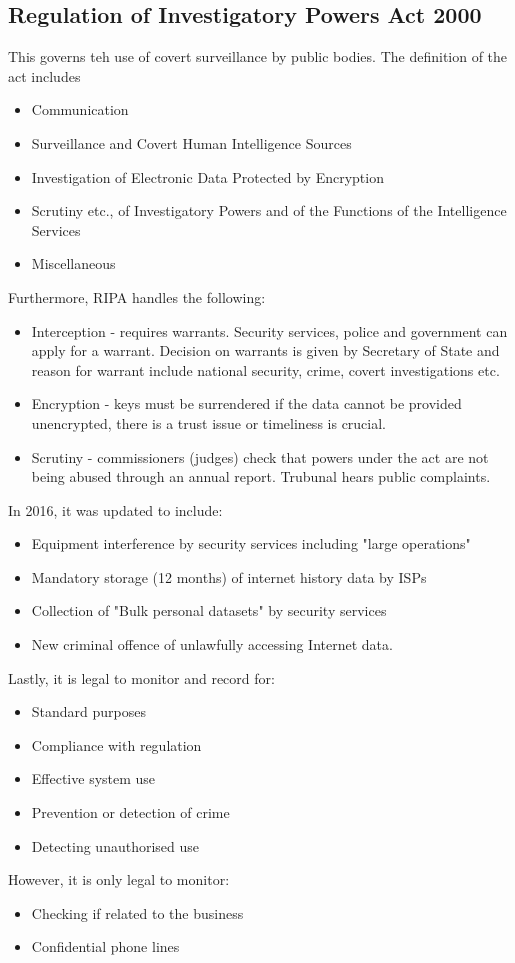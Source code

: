 \documentclass[a4paper]{article}
\theoremstyle{plain}
\theoremstyle{definition}
\theoremstyle{remark}
\begin{document}
\subsection{Regulation of Investigatory Powers Act 2000}
This governs teh use of covert surveillance by public bodies. The definition of the act includes
\begin{itemize}
	\item Communication
	\item Surveillance and Covert Human Intelligence Sources
	\item Investigation of Electronic Data Protected by Encryption
	\item Scrutiny etc., of Investigatory Powers and of the Functions of the Intelligence Services
	\item Miscellaneous 
\end{itemize}
Furthermore, RIPA handles the following:
\begin{itemize}
	\item Interception - requires warrants. Security services, police and government can apply for a warrant. Decision on warrants is given by Secretary of State and reason for warrant include national security, crime, covert investigations etc.
	\item Encryption - keys must be surrendered if the data cannot be provided unencrypted, there is a trust issue or timeliness is crucial.
	\item Scrutiny - commissioners (judges) check that powers under the act are not being abused through an annual report. Trubunal hears public complaints.
\end{itemize}
In 2016, it was updated to include:
\begin{itemize}
	\item Equipment interference by security services including "large operations"
	\item Mandatory storage (12 months) of internet history data by ISPs
	\item Collection of "Bulk personal datasets" by security services
	\item New criminal offence of unlawfully accessing Internet data.
\end{itemize}
Lastly, it is legal to monitor and record for:
\begin{itemize}
	\item Standard purposes
	\item Compliance with regulation
	\item Effective system use
	\item Prevention or detection of crime
	\item Detecting unauthorised use
\end{itemize}
However, it is only legal to monitor:
\begin{itemize}
	\item Checking if related to the business
	\item Confidential phone lines
\end{itemize}
\end{document}
